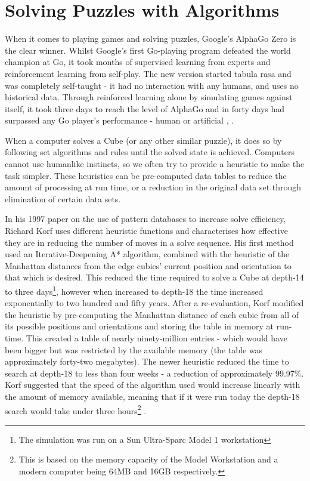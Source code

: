 \documentclass{report}
\begin{document}
    \section{Solving Puzzles with Algorithms}
    When it comes to playing games and solving puzzles, Google’s AlphaGo Zero is the clear winner. Whilst Google’s first Go-playing program defeated the world champion at Go, it took months of supervised learning from experts and reinforcement learning from self-play. The new version started tabula rasa and was completely self-taught - it had no interaction with any humans, and uses no historical data. Through reinforced learning alone by simulating games against itself, it took three days to reach the level of AlphaGo and in forty days had surpassed any Go player’s performance - human or artificial \cite{Silver2017}, \cite{Cellan-Jones2017}.
    
    When a computer solves a Cube (or any other similar puzzle), it does so by following set algorithms and rules until the solved state is achieved. Computers cannot use humanlike instincts, so we often try to provide a heuristic to make the task simpler. These heuristics can be pre-computed data tables to reduce the amount of processing at run time, or a reduction in the original data set through elimination of certain data sets.
    
    In his 1997 paper on the use of pattern databases to increase solve efficiency, Richard Korf uses different heuristic functions and characterises how effective they are in reducing the number of moves in a solve sequence. His first method used an Iterative-Deepening A* algorithm, combined with the heuristic of the Manhattan distances from the edge cubies’ current position and orientation to that which is desired. This reduced the time required to solve a Cube at depth-14 to three days\footnote{The simulation was run on a Sun Ultra-Sparc Model 1 workstation}, however when increased to depth-18 the time increased exponentially to two hundred and fifty years. After a re-evaluation, Korf modified the heuristic by pre-computing the Manhattan distance of each cubie from all of its possible positions and orientations and storing the table in memory at run-time. This created a table of nearly ninety-million entries - which would have been bigger but was restricted by the available memory (the table was approximately forty-two megabytes). The newer heuristic reduced the time to search at depth-18 to less than four weeks - a reduction of approximately 99.97\%. Korf suggested that the speed of the algorithm used would increase linearly with the amount of memory available, meaning that if it were run today the depth-18 search would take under three hours\footnote{This is based on the memory capacity of the Model Workstation and a modern computer being 64MB and 16GB respectively.} \cite{Korf1997}.
    
\end{document}
